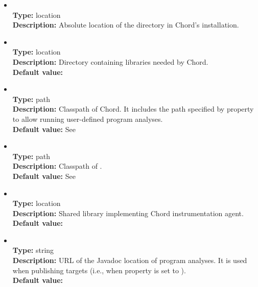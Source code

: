 \begin{itemize}
\item
{} \\
{\bf Type:} location \\
{\bf Description:} Absolute location of the  directory in Chord's installation.

\item
{} \\
{\bf Type:} location \\
{\bf Description:} Directory containing libraries needed by Chord. \\
{\bf Default value:} 

\item
{} \\
{\bf Type:} path \\
{\bf Description:} Classpath of Chord.  It includes the path specified by property  to allow running user-defined program analyses. \\
{\bf Default value:} See  

\item
{} \\
{\bf Type:} path \\
{\bf Description:} Classpath of . \\
{\bf Default value:} See  

\item
{} \\
{\bf Type:} location \\
{\bf Description:} Shared library implementing Chord instrumentation agent. \\
{\bf Default value:}  

\item
{} \\
{\bf Type:} string \\
{\bf Description:} URL of the Javadoc location of program analyses.  It is used when publishing targets (i.e., when property  is set to ). \\
{\bf Default value:} 
\end{itemize}

